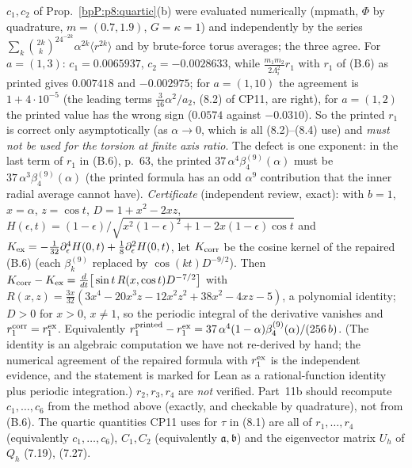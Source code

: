 \begin{remark}\label{bpP:p8:cp11-check}
$c_1,c_2$ of Prop.~\ref{bpP:p8:quartic}(b) were evaluated numerically (mpmath, $\Phi$ by quadrature, $m=(0.7,1.9)$, $G=\kappa=1$) and independently by the series $\sum_k\binom{2k}k^24^{-2k}\alpha^{2k}\langle r^{2k}\rangle$ and by brute-force torus averages; the three agree. For $a=(1,3)$: $c_1=0.0065937$, $c_2=-0.0028633$, while $\frac{m_1m_2}{2\Lambda_i^2}r_1$ with $r_1$ of (B.6) as printed gives $0.007418$ and $-0.002975$; for $a=(1,10)$ the agreement is $1+4\cdot10^{-5}$ (the leading terms $\tfrac3{16}\alpha^2/a_2$, (8.2) of CP11, are right), for $a=(1,2)$ the printed value has the wrong sign ($0.0574$ against $-0.0310$). So the printed $r_1$ is correct only asymptotically (as $\alpha\to0$, which is all (8.2)--(8.4) use) and \emph{must not be used for the torsion at finite axis ratio}. The defect is one exponent: in the last term of $r_1$ in (B.6), p.~63, the printed $37\,\alpha^4\beta_4^{(9)}(\alpha)$ must be $37\,\alpha^3\beta_4^{(9)}(\alpha)$ (the printed formula has an odd $\alpha^9$ contribution that the inner radial average cannot have). \emph{Certificate} (independent review, exact): with $b=1$, $x=\alpha$, $z=\cos t$, $D=1+x^2-2xz$, $H(\epsilon,t)=(1-\epsilon)/\sqrt{x^2(1-\epsilon)^2+1-2x(1-\epsilon)\cos t}$ and $K_{\rm ex}=-\tfrac1{32}\partial_\epsilon^4H(0,t)+\tfrac18\partial_\epsilon^2H(0,t)$, let $K_{\rm corr}$ be the cosine kernel of the repaired (B.6) (each $\beta_k^{(9)}$ replaced by $\cos(kt)D^{-9/2}$). Then $K_{\rm corr}-K_{\rm ex}=\frac{d}{dt}\big[\sin t\,R(x,\cos t)D^{-7/2}\big]$ with $R(x,z)=\tfrac{3x}{32}(3x^4-20x^3z-12x^2z^2+38x^2-4xz-5)$, a polynomial identity; $D>0$ for $x>0$, $x\ne1$, so the periodic integral of the derivative vanishes and $r_1^{\rm corr}=r_1^{\rm ex}$. Equivalently $r_1^{\rm printed}-r_1^{\rm ex}=37\,\alpha^4(1-\alpha)\beta_4^{(9)}(\alpha)/(256\,b)$. (The identity is an algebraic computation we have not re-derived by hand; the numerical agreement of the repaired formula with $r_1^{\rm ex}$ is the independent evidence, and the statement is marked for Lean as a rational-function identity plus periodic integration.) $r_2,r_3,r_4$ are \emph{not} verified. Part~11b should recompute $c_1,\dots,c_6$ from the method above (exactly, and checkable by quadrature), not from (B.6). The quartic quantities CP11 uses for $\tau$ in (8.1) are all of $r_1,\dots,r_4$ (equivalently $c_1,\dots,c_6$), $C_1,C_2$ (equivalently $\mathfrak a,\mathfrak b$) and the eigenvector matrix $U_h$ of $Q_h$ (7.19), (7.27).
\end{remark}

